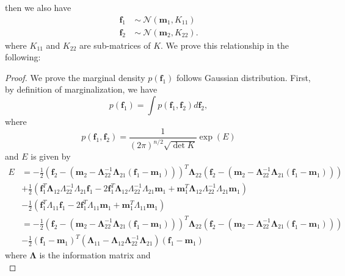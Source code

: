 \documentclass[11pt,a4paper]{article}
\theoremstyle{definition}
\numberwithin{equation}{section}
\let\vec\mathbf
\begin{document}
	then we also have 
	\begin{equation*} \label{}
	\begin{split}
	\vec f_1\ & \sim \ \mathcal N \left(\vec m_1 , K_{11} \right)\\
	\vec f_2\ & \sim \ \mathcal N \left(\vec m_2 , K_{22} \right).
	\end{split}
	\end{equation*}
	where $K_{11}$ and  $K_{22}$ are sub-matrices of $K$. We prove this relationship in the following:
	\begin{proof}
		We prove the marginal density $p(\vec f_1)$ follows Gaussian distribution. First, by definition of marginalization, we have
		\begin{equation*} \label{}
		p(\vec f_1) = \int p(\vec f_1,\vec f_2)d \vec f_2,
		\end{equation*}
		where 
		\begin{equation*} \label{}
		p(\vec f_1,\vec f_2) = \frac{1}{(2\pi)^{n/2}\sqrt{\det K}}\exp{(E)}
		\end{equation*}
		and $E$ is given by
		\begin{equation*} \label{}
		\begin{split}
		E &= -\frac{1}{2}\left(\vec f_2-(\vec m_2 - \vec\Lambda_{22}^{-1} \vec\Lambda_{21}(\vec f_1 - \vec m_1))\right)^T\vec\Lambda_{22}\left(\vec f_2-(\vec m_2 - \vec\Lambda_{22}^{-1} \vec\Lambda_{21}(\vec f_1 - \vec m_1))\right)\\
		&+\frac{1}{2}\left(\vec f_1^T \vec\Lambda_{12}\Lambda_{22}^{-1}\Lambda_{21}\vec f_1 - 2\vec f_1^T \vec\Lambda_{12}\Lambda_{22}^{-1}\Lambda_{21}\vec m_1 + \vec m_1^T \vec\Lambda_{12}\Lambda_{22}^{-1}\Lambda_{21}\vec m_1\right)\\
		&-\frac{1}{2}\left(\vec f_1^T\Lambda_{11}\vec f_1 - 2\vec f_1^T\Lambda_{11}\vec m_1 + \vec m_1^T\Lambda_{11}\vec m_1\right)\\
		&=-\frac{1}{2}\left(\vec f_2-(\vec m_2 - \vec\Lambda_{22}^{-1} \vec\Lambda_{21}(\vec f_1 - \vec m_1))\right)^T\vec\Lambda_{22}\left(\vec f_2-(\vec m_2 - \vec\Lambda_{22}^{-1} \vec\Lambda_{21}(\vec f_1 - \vec m_1))\right)\\
		&-\frac{1}{2}\left(\vec f_1 - \vec m_1\right)^T\left(\vec\Lambda_{11}-\vec\Lambda_{12}\vec\Lambda_{22}^{-1}\vec\Lambda_{21}\right)\left(\vec f_1 - \vec m _1 \right)
		\end{split}
		\end{equation*}
		where $\vec\Lambda$ is the information matrix and
		\begin{equation*} \label{}

\end{equation*}
\end{proof}
\end{document}
